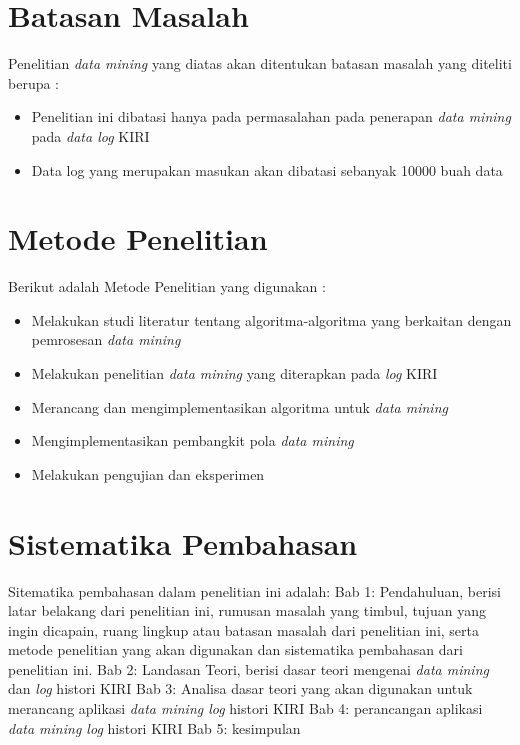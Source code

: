 \section{Batasan Masalah}
Penelitian \textsl{data mining} yang diatas akan ditentukan batasan masalah yang diteliti berupa : 
\begin{itemize}
	\item Penelitian ini dibatasi hanya pada permasalahan pada penerapan \textsl{data mining} pada \textsl{data log} KIRI
	\item Data log yang merupakan masukan akan dibatasi sebanyak 10000 buah data
\end{itemize}

\section{Metode Penelitian}
Berikut adalah Metode Penelitian yang digunakan : 
	\begin{itemize}
		\item Melakukan studi literatur tentang algoritma-algoritma yang berkaitan dengan pemrosesan \textsl{data mining}
		\item Melakukan penelitian \textsl{data mining} yang diterapkan pada \textsl{log} KIRI
		\item Merancang dan mengimplementasikan algoritma untuk \textsl{data mining}
		\item Mengimplementasikan pembangkit pola \textsl{data mining}
		\item Melakukan pengujian dan eksperimen
	\end{itemize}

\section{Sistematika Pembahasan}
Sitematika pembahasan dalam penelitian ini adalah:
Bab 1: Pendahuluan, berisi latar belakang dari penelitian ini, rumusan masalah yang timbul, tujuan yang ingin dicapain, ruang lingkup atau batasan masalah dari penelitian ini, serta metode penelitian yang akan digunakan dan sistematika pembahasan dari penelitian ini.
Bab 2: Landasan Teori, berisi dasar teori mengenai \textsl{data mining} dan \textsl{log} histori KIRI
Bab 3: Analisa dasar teori yang akan digunakan untuk merancang aplikasi \textsl{data mining log} histori KIRI 
Bab 4: perancangan aplikasi \textsl{data mining log} histori KIRI
Bab 5: kesimpulan